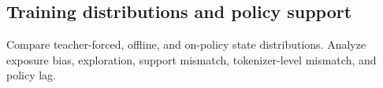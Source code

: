 \subsection{Training distributions and policy support}
Compare teacher-forced, offline, and on-policy state distributions. Analyze exposure
bias, exploration, support mismatch, tokenizer-level mismatch, and policy lag.

